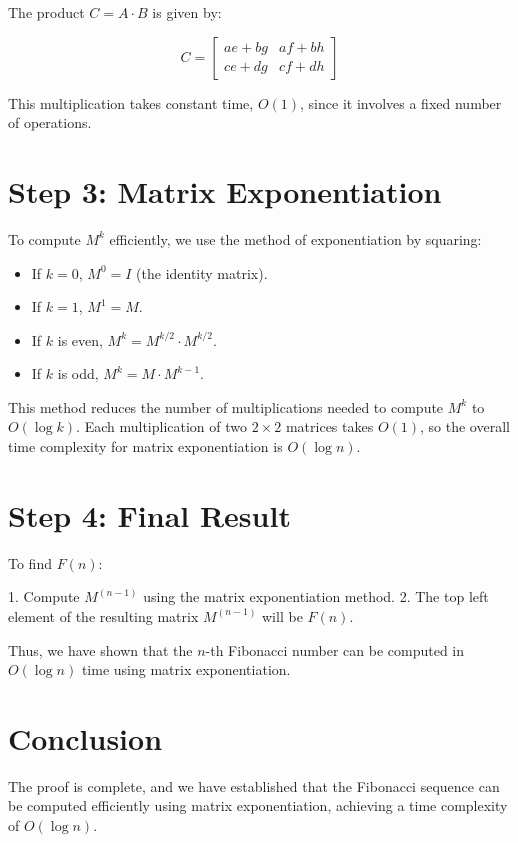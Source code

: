 \documentclass{article}
\begin{document}
	The product $C = A \cdot B$ is given by:
	
	$$C = \begin{bmatrix} ae + bg & af + bh \\ ce + dg & cf + dh \end{bmatrix}$$
	
	This multiplication takes constant time, $O(1)$, since it involves a fixed number of operations.
	
	\section*{Step 3: Matrix Exponentiation}
	To compute $M^k$ efficiently, we use the method of exponentiation by squaring:
	
	\begin{itemize}
		\item If $k = 0$, $M^0 = I$ (the identity matrix).
		\item If $k = 1$, $M^1 = M$.
		\item If $k$ is even, $M^k = M^{k/2} \cdot M^{k/2}$.
		\item If $k$ is odd, $M^k = M \cdot M^{k-1}$.
	\end{itemize}
	
	This method reduces the number of multiplications needed to compute $M^k$ to $O(\log k)$. Each multiplication of two $2 \times 2$ matrices takes $O(1)$, so the overall time complexity for matrix exponentiation is $O(\log n)$.
	
	\section*{Step 4: Final Result}
	To find $F(n)$:
	
	1. Compute $M^{(n-1)}$ using the matrix exponentiation method.
	2. The top left element of the resulting matrix $M^{(n-1)}$ will be $F(n)$.
	
	Thus, we have shown that the $n$-th Fibonacci number can be computed in $O(\log n)$ time using matrix exponentiation.
	
	\section*{Conclusion}
	The proof is complete, and we have established that the Fibonacci sequence can be computed efficiently using matrix exponentiation, achieving a time complexity of $O(\log n)$.
	
\end{document}
